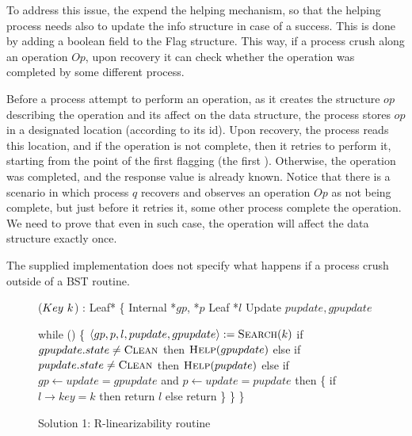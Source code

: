 To address this issue, the expend the helping mechanism, so that the helping process needs also to update the info structure in case of a success. This is done by adding a boolean field to the Flag structure. This way, if a process crush along an operation $Op$, upon recovery it can check whether the operation was completed by some different process. 

Before a process attempt to perform an operation, as it creates the \Flag structure $op$ describing the operation and its affect on the data structure, the process stores $op$ in a designated location (according to its id). Upon recovery, the process reads this location, and if the operation is not complete, then it retries to perform it, starting from the point of the first flagging (the first \CASB). Otherwise, the operation was completed, and the response value is already known. Notice that there is a scenario in which process $q$ recovers and observes an operation $Op$ as not being complete, but just before it retries it, some other process complete the operation. We need to prove that even in such case, the operation will affect the data structure exactly once.

The supplied implementation does not specify what happens if a process crush outside of a BST routine. 



\begin{figure*}
	\footnotesize
	
	\begin{code}
		($Key\ k$) : Leaf* \{ \nlc
		\n Internal *$gp$, *$p$\nlc
		Leaf *$l$\nlc
		Update $pupdate, gpupdate$\bl
		\nlc
		
		while (\TRUE) \{ \nlc \n
		$\langle gp, p, l, pupdate, gpupdate \rangle := \mbox{\sc Search}(k)$\nlc
		if $gpupdate.state \neq \mbox{\sc Clean}$ then $\mbox{\sc Help}(gpupdate)$ \nlc
		else if $pupdate.state \neq \mbox{\sc Clean}$ then $\mbox{\sc Help}(pupdate)$ \nlc
		else if $gp \leftarrow update = gpupdate$ and $p \leftarrow update = pupdate$ then \{ \nlc \n
		if $l \rightarrow key = k$ then return $l$ \nlc
		else return \NULL \nlc
		\p \} \nlc
		\p \} \nlc
		\p \}
	\end{code}
	
	\caption{Solution 1: R-linearizability  routine}
	\label{robust find - solution 1}
\end{figure*}



